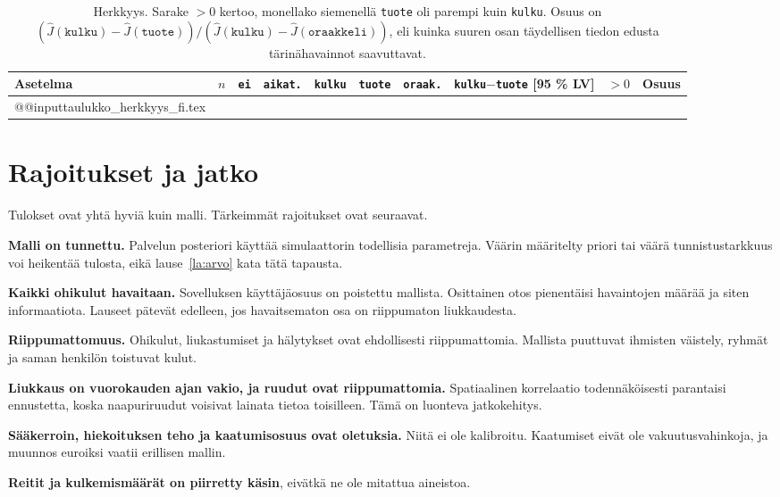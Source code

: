 \documentclass[11pt,a4paper]{article}
\makeatletter
\theoremstyle{plain}
\theoremstyle{definition}
\theoremstyle{remark}
\newcommand{\1}{\mathbf{1}}
\newcommand{\pol}[1]{\texttt{#1}}
\newcommand{\rivit}[1]{\csname @@input\endcsname #1 }
\makeatother
\begin{document}
\begin{table}[ht]
\centering
\footnotesize
\setlength{\tabcolsep}{3.5pt}
\begin{tabular}{@{}lrrrrrrcrr@{}}
\toprule
Asetelma & $n$ & \pol{ei} & \pol{aikat.} & \pol{kulku} & \pol{tuote} & \pol{oraak.} & \pol{kulku}$-$\pol{tuote} [95 \% LV] & $>0$ & Osuus \\
\midrule
\rivit{taulukko_herkkyys_fi.tex}
\bottomrule
\end{tabular}
\caption{Herkkyys. Sarake ${>}0$ kertoo, monellako siemenellä \pol{tuote} oli
parempi kuin \pol{kulku}. Osuus on
$(\hat J(\pol{kulku}) - \hat J(\pol{tuote}))/(\hat J(\pol{kulku}) - \hat J(\pol{oraakkeli}))$,
eli kuinka suuren osan täydellisen tiedon edusta tärinähavainnot saavuttavat.}
\label{tab:herkkyys}
\end{table}



\section{Rajoitukset ja jatko}

Tulokset ovat yhtä hyviä kuin malli. Tärkeimmät rajoitukset ovat seuraavat.

\textbf{Malli on tunnettu.} Palvelun posteriori käyttää simulaattorin todellisia
parametreja. Väärin määritelty priori tai väärä tunnistustarkkuus voi heikentää
tulosta, eikä lause~\ref{la:arvo} kata tätä tapausta.

\textbf{Kaikki ohikulut havaitaan.} Sovelluksen käyttäjäosuus on poistettu
mallista. Osittainen otos pienentäisi havaintojen määrää ja siten informaatiota.
Lauseet pätevät edelleen, jos havaitsematon osa on riippumaton liukkaudesta.

\textbf{Riippumattomuus.} Ohikulut, liukastumiset ja hälytykset ovat
ehdollisesti riippumattomia. Mallista puuttuvat ihmisten väistely, ryhmät ja
saman henkilön toistuvat kulut.

\textbf{Liukkaus on vuorokauden ajan vakio, ja ruudut ovat riippumattomia.}
Spatiaalinen korrelaatio todennäköisesti parantaisi ennustetta, koska
naapuriruudut voisivat lainata tietoa toisilleen. Tämä on luonteva jatkokehitys.

\textbf{Sääkerroin, hiekoituksen teho ja kaatumisosuus ovat oletuksia.} Niitä ei
ole kalibroitu. Kaatumiset eivät ole vakuutusvahinkoja, ja muunnos euroiksi
vaatii erillisen mallin.

\textbf{Reitit ja kulkemismäärät on piirretty käsin}, eivätkä ne ole mitattua
aineistoa.
\end{document}
